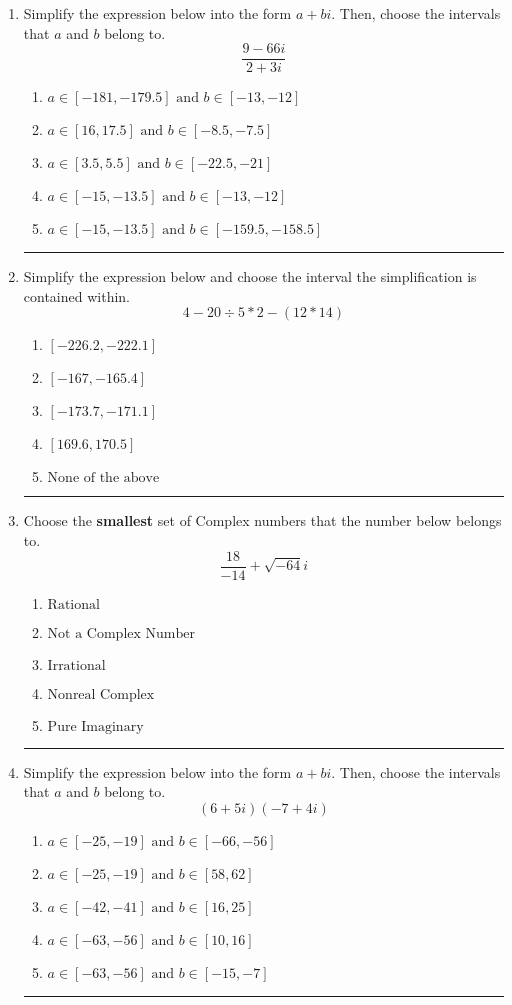 \documentclass[14pt]{extbook}
\newcommand{\litem}[1]{\item#1\hspace*{-1cm}\rule{\textwidth}{0.4pt}}
\begin{document}
\begin{enumerate}
{\begin{enumerate}[label=\Alph*.]
\end{enumerate} }
\litem{
Simplify the expression below into the form $a+bi$. Then, choose the intervals that $a$ and $b$ belong to.\[ \frac{9 - 66 i}{2 + 3 i} \]\begin{enumerate}[label=\Alph*.]
\item \( a \in [-181, -179.5] \text{ and } b \in [-13, -12] \)
\item \( a \in [16, 17.5] \text{ and } b \in [-8.5, -7.5] \)
\item \( a \in [3.5, 5.5] \text{ and } b \in [-22.5, -21] \)
\item \( a \in [-15, -13.5] \text{ and } b \in [-13, -12] \)
\item \( a \in [-15, -13.5] \text{ and } b \in [-159.5, -158.5] \)

\end{enumerate} }
\litem{
Simplify the expression below and choose the interval the simplification is contained within.\[ 4 - 20 \div 5 * 2 - (12 * 14) \]\begin{enumerate}[label=\Alph*.]
\item \( [-226.2, -222.1] \)
\item \( [-167, -165.4] \)
\item \( [-173.7, -171.1] \)
\item \( [169.6, 170.5] \)
\item \( \text{None of the above} \)

\end{enumerate} }
\litem{
Choose the \textbf{smallest} set of Complex numbers that the number below belongs to.\[ \frac{18}{-14}+\sqrt{-64}i \]\begin{enumerate}[label=\Alph*.]
\item \( \text{Rational} \)
\item \( \text{Not a Complex Number} \)
\item \( \text{Irrational} \)
\item \( \text{Nonreal Complex} \)
\item \( \text{Pure Imaginary} \)

\end{enumerate} }
\litem{
Simplify the expression below into the form $a+bi$. Then, choose the intervals that $a$ and $b$ belong to.\[ (6 + 5 i)(-7 + 4 i) \]\begin{enumerate}[label=\Alph*.]
\item \( a \in [-25, -19] \text{ and } b \in [-66, -56] \)
\item \( a \in [-25, -19] \text{ and } b \in [58, 62] \)
\item \( a \in [-42, -41] \text{ and } b \in [16, 25] \)
\item \( a \in [-63, -56] \text{ and } b \in [10, 16] \)
\item \( a \in [-63, -56] \text{ and } b \in [-15, -7] \)


\end{enumerate}}
\end{enumerate}
\end{document}
